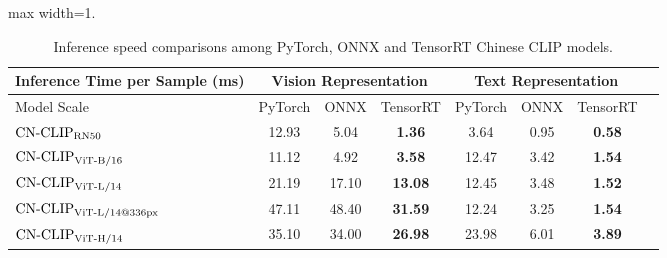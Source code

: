 \begin{table}[t]
\center
\small
\begin{adjustbox}{max width=1.\textwidth}
\begin{tabular}{@{\extracolsep{\fill}}lccccccc}
\toprule
  Inference Time per Sample (ms)
  &\multicolumn{3}{c}{Vision Representation}
  &\multicolumn{3}{c}{Text Representation}
  \\
\midrule
  Model Scale & PyTorch & ONNX & TensorRT & PyTorch & ONNX & TensorRT
  \\
\midrule
  $\text{CN-CLIP}\rm_{RN50}$
  & 12.93	& 5.04	& \textbf{1.36} & 	3.64 & 	0.95 &	\textbf{0.58}
  \\
  $\text{CN-CLIP}\rm_{ViT\text{-}B/16}$
  & 11.12	& 4.92	& \textbf{3.58}	& 12.47	& 3.42	& \textbf{1.54}
  \\
  $\text{CN-CLIP}\rm_{ViT\text{-}L/14}$
  & 21.19	& 17.10	& \textbf{13.08}	& 12.45	& 3.48	& \textbf{1.52}
  \\
  $\text{CN-CLIP}\rm_{ViT\text{-}L/14@336px}$
  & 47.11	& 48.40	& \textbf{31.59}	& 12.24	& 3.25	& \textbf{1.54}
  \\
  $\text{CN-CLIP}\rm_{ViT\text{-}H/14}$
  & 35.10	& 34.00	& \textbf{26.98}	& 23.98	& 6.01	& \textbf{3.89}
  \\  

\bottomrule
\end{tabular}
\end{adjustbox}
\caption{Inference speed comparisons among PyTorch, ONNX and TensorRT Chinese CLIP models.}
\label{tb:deployment_speed}
\end{table}